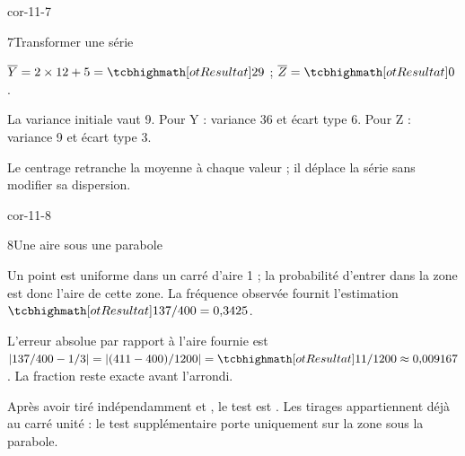 \begin{blocLivre}{cor-11-7}
\begin{corrige}{7}{Transformer une série}
\begin{questions}
\item $\overline Y=2\times12+5=\res{29}$ ; $\overline Z=\res{0}$.
\item La variance initiale vaut 9. Pour Y : variance 36 et écart type 6. Pour Z : variance 9 et écart type 3.
\item Le centrage retranche la moyenne à chaque valeur ; il déplace la série sans modifier sa dispersion.
\end{questions}
\end{corrige}
\end{blocLivre}
\begin{blocLivre}{cor-11-8}
\begin{corrige}{8}{Une aire sous une parabole}
\begin{questions}
\item Un point est uniforme dans un carré d’aire 1 ; la probabilité d’entrer dans la zone est donc l’aire de cette zone.
La fréquence observée fournit l’estimation $\res{137/400=0{,}3425}$.
\item L’erreur absolue par rapport à l’aire fournie est
$|137/400-1/3|=|(411-400)/1200|=\res{11/1200\approx0{,}009167}$.
La fraction reste exacte avant l’arrondi.
\item Après avoir tiré indépendamment  et , le test est .
Les tirages appartiennent déjà au carré unité : le test supplémentaire porte uniquement sur la zone sous la parabole.
\end{questions}

\label{figlivre-r11-08-zone-cor}

\end{corrige}
\end{blocLivre}
